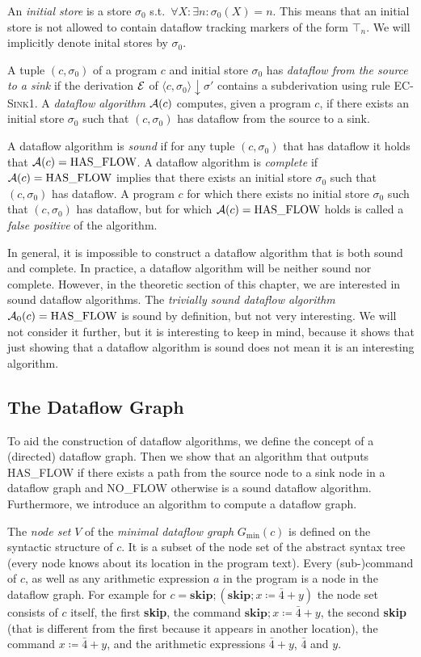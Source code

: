 An \emph{initial store} is a store $\sigma_0$ s.t.\ 
$\forall X: \exists n: \sigma_0(X) = n$.
This means that an initial store is not allowed to contain dataflow tracking 
markers of the form $\top_n$.
We will implicitly denote inital stores by $\sigma_0$.

A tuple $(c, \sigma_0)$ of a program $c$ and initial store $\sigma_0$ 
has \emph{dataflow from the source to a sink} if the derivation $\operatorname{\mathcal{E}}$
of $\langle c, \sigma_0 \rangle \downarrow \sigma'$ contains a 
subderivation using rule \textsc{EC-Sink1}.
A \emph{dataflow algorithm} $\operatorname{\mathcal{A}}(c)$ computes, given a program $c$,
if there exists an initial store $\sigma_0$ 
such that $(c, \sigma_0)$ has dataflow from the source to a sink.

A dataflow algorithm is \emph{sound} if for any tuple $(c, \sigma_0)$ that
has dataflow it holds that $\operatorname{\mathcal{A}}(c) = \text{HAS\_FLOW}$.
A dataflow algorithm is \emph{complete} if $\operatorname{\mathcal{A}}(c) = \text{HAS\_FLOW}$
implies that there exists an initial store $\sigma_0$
 such that $(c, \sigma_0)$ has dataflow.
A program $c$ for which there exists no initial store $\sigma_0$ such that 
$(c, \sigma_0)$ has dataflow, but for which $\operatorname{\mathcal{A}}(c) = \text{HAS\_FLOW}$ holds
is called a \emph{false positive} of the algorithm.

In general, it is impossible to construct a dataflow algorithm that is both 
sound and complete.
In practice, a dataflow algorithm will be neither sound nor complete.
However, in the theoretic section of this chapter, we are interested in 
sound dataflow algorithms.
The \emph{trivially sound dataflow algorithm} $\operatorname{\mathcal{A}}_0(c) = \text{HAS\_FLOW}$ 
is sound by definition, but not very interesting.
We will not consider it further, but it is interesting to keep in mind,
because it shows that just showing that a dataflow algorithm is sound does not
mean it is an interesting algorithm.

\subsection{The Dataflow Graph}
To aid the construction of dataflow algorithms, we define the concept
of a (directed) dataflow graph.
Then we show that an algorithm that outputs HAS\_FLOW if 
there exists a path from the source 
node to a sink node in a dataflow graph and NO\_FLOW otherwise
is a sound dataflow algorithm.
Furthermore, we introduce an algorithm to compute a dataflow graph.

The \emph{node set} $V$ of the \emph{minimal dataflow graph} $G_\text{min}(c)$
is defined on the syntactic structure
of $c$. It is a subset of the node set of the abstract syntax tree
(every node knows about its location in the program text).
Every (sub-)command of $c$, as well as any arithmetic expression $a$ in the 
program is a node in the dataflow graph.
For example for
$c = \textbf{skip}; (\textbf{skip}; x \coloneqq \bar{4} + y)$
the node set consists of $c$ itself, the first \textbf{skip}, the command 
$\textbf{skip}; x \coloneqq \bar{4} + y$, the second \textbf{skip} (that is different 
from the first because it appears in another location), the command
$x \coloneqq \bar{4} + y$, and the arithmetic expressions $\bar{4}+y$,
$\bar{4}$ and $y$.

